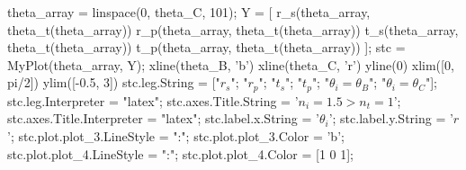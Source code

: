 \documentclass[UTF8]{report}
\theoremstyle{MyLineTheoremStyle} %
\theoremstyle{MyBlockTheoremStyle} %
\theoremstyle{MySubsubsectionStyle} %
\begin{document}
\begin{matlablisting}
theta_array = linspace(0, theta_C, 101);
Y = [
    r_s(theta_array, theta_t(theta_array))
    r_p(theta_array, theta_t(theta_array))
    t_s(theta_array, theta_t(theta_array))
    t_p(theta_array, theta_t(theta_array))
    ];
stc = MyPlot(theta_array, Y);
xline(theta_B, 'b')
xline(theta_C, 'r')
yline(0)
xlim([0, pi/2])
ylim([-0.5, 3])
stc.leg.String = ["$r_s$"; "$r_p$"; "$t_s$"; "$t_p$"; "$\theta_i = \theta_B$"; "$\theta_i = \theta_C$"];
stc.leg.Interpreter = "latex";
stc.axes.Title.String = '$n_i = 1.5 > n_t = 1$';
stc.axes.Title.Interpreter = "latex";
stc.label.x.String = '$\theta_i$';
stc.label.y.String = '$r$';
stc.plot.plot_3.LineStyle = ":";
stc.plot.plot_3.Color = 'b';
stc.plot.plot_4.LineStyle = ":";
stc.plot.plot_4.Color = [1 0 1];
\end{matlablisting}


\end{document}
